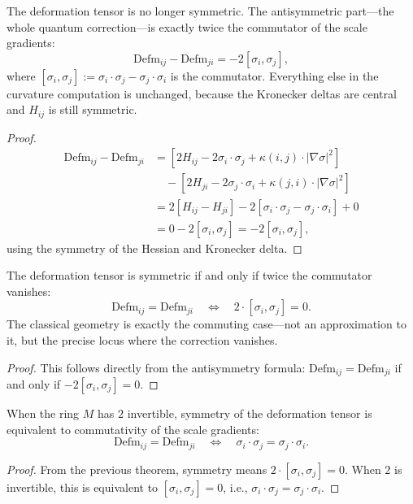 \begin{theorem}
The deformation tensor is no longer symmetric. The antisymmetric part—the whole quantum correction—is exactly twice the commutator of the scale gradients:
\[
\text{Defm}_{ij} - \text{Defm}_{ji} = -2 [\sigma_i, \sigma_j] ,
\]
where $[\sigma_i, \sigma_j] := \sigma_i \cdot \sigma_j - \sigma_j \cdot \sigma_i$ is the commutator. Everything else in the curvature computation is unchanged, because the Kronecker deltas are central and $H_{ij}$ is still symmetric.
\begin{proof}
\begin{align}
\text{Defm}_{ij} - \text{Defm}_{ji} &= [2 H_{ij} - 2 \sigma_i \cdot \sigma_j + \kappa(i,j) \cdot |\nabla \sigma|^2] \\
&\quad - [2 H_{ji} - 2 \sigma_j \cdot \sigma_i + \kappa(j,i) \cdot |\nabla \sigma|^2] \\
&= 2[H_{ij} - H_{ji}] - 2[\sigma_i \cdot \sigma_j - \sigma_j \cdot \sigma_i] + 0 \\
&= 0 - 2[\sigma_i, \sigma_j] = -2[\sigma_i, \sigma_j] ,
\end{align}
using the symmetry of the Hessian and Kronecker delta.
\end{proof}
\end{theorem}

\begin{theorem}
The deformation tensor is symmetric if and only if twice the commutator vanishes:
\[
\text{Defm}_{ij} = \text{Defm}_{ji} \quad \iff \quad 2 \cdot [\sigma_i, \sigma_j] = 0 .
\]
The classical geometry is exactly the commuting case—not an approximation to it, but the precise locus where the correction vanishes.
\begin{proof}
This follows directly from the antisymmetry formula: $\text{Defm}_{ij} = \text{Defm}_{ji}$ if and only if $-2[\sigma_i, \sigma_j] = 0$.
\end{proof}
\end{theorem}

\begin{theorem}
When the ring $M$ has $2$ invertible, symmetry of the deformation tensor is equivalent to commutativity of the scale gradients:
\[
\text{Defm}_{ij} = \text{Defm}_{ji} \quad \iff \quad \sigma_i \cdot \sigma_j = \sigma_j \cdot \sigma_i .
\]
\begin{proof}
From the previous theorem, symmetry means $2 \cdot [\sigma_i, \sigma_j] = 0$. When $2$ is invertible, this is equivalent to $[\sigma_i, \sigma_j] = 0$, i.e., $\sigma_i \cdot \sigma_j = \sigma_j \cdot \sigma_i$.
\end{proof}
\end{theorem}


